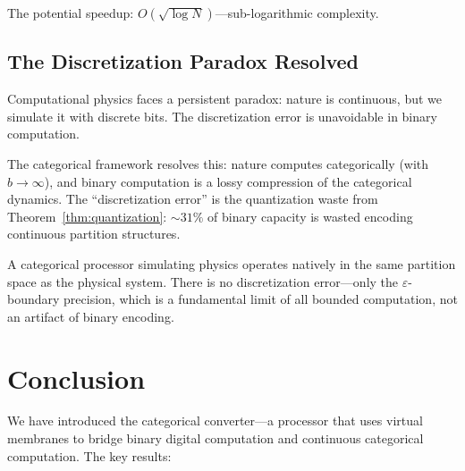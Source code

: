 \documentclass[twocolumn,10pt]{article}
\theoremstyle{remark}
\newcommand{\eps}{\varepsilon}
\begin{document}
The potential speedup: $O(\sqrt{\log N})$---sub-logarithmic complexity.

\subsection{The Discretization Paradox Resolved}

Computational physics faces a persistent paradox: nature is continuous, but we simulate it with discrete bits. The discretization error is unavoidable in binary computation.

The categorical framework resolves this: nature computes categorically (with $b \to \infty$), and binary computation is a lossy compression of the categorical dynamics. The ``discretization error'' is the quantization waste from Theorem~\ref{thm:quantization}: $\sim 31\%$ of binary capacity is wasted encoding continuous partition structures.

A categorical processor simulating physics operates natively in the same partition space as the physical system. There is no discretization error---only the $\eps$-boundary precision, which is a fundamental limit of all bounded computation, not an artifact of binary encoding.

\section{Conclusion}

We have introduced the categorical converter---a processor that uses virtual membranes to bridge binary digital computation and continuous categorical computation. The key results:
\end{document}
